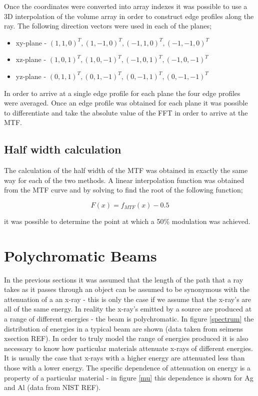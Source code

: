 \documentclass[
  twoside,
  11pt, a4paper,
  footinclude=true,
  headinclude=true,
  cleardoublepage=empty
]{scrbook}
\begin{document}
Once the coordinates were converted into array indexes it was possible to use a 3D interpolation of the volume array in order to construct edge profiles along the ray. The following direction vectors were used in each of the planes;

\begin{itemize}
\item xy-plane - ${(1,1,0)^T,(1,-1,0)^T,(-1,1,0)^T,(-1,-1,0)^T}$
\item xz-plane - ${(1,0,1)^T,(1,0,-1)^T,(-1,0,1)^T,(-1,0,-1)^T}$
\item yz-plane - ${(0,1,1)^T,(0,1,-1)^T,(0,-1,1)^T,(0,-1,-1)^T}$
\end{itemize}

In order to arrive at a single edge profile for each plane the four edge profiles were averaged. Once an edge profile was obtained for each plane it was possible to differentiate and take the absolute value of the FFT in order to arrive at the MTF.

\subsection{Half width calculation}

The calculation of the half width of the MTF was obtained in exactly the same way for each of the two methods. A linear interpolation function was obtained from the MTF curve and by solving to find the root of the following function;

\[
F(x) = f_{MTF}(x) - 0.5
\]

it was possible to determine the point at which a 50\% modulation was achieved.

\section{Polychromatic Beams}

In the previous sections it was assumed that the length of the path that a ray takes as it passes through an object can be assumed to be synonymous with the attenuation of a an x-ray - this is only the case if we assume that the x-ray's are all of the same energy. In reality the x-ray's emitted by a source are produced at a range of different energies - the beam is polychromatic. In figure \ref{spectrum} the distribution of energies in a typical beam are shown (data taken from seimens xsection REF). In order to truly model the range of energies produced it is also necessary to know how particular materials attenuate x-rays of different energies. It is usually the case that x-rays with a higher energy are attenuated less than those with a lower energy. The specific dependence of attenuation on energy is a property of a particular material - in figure \ref{mu} this dependence is shown for Ag and Al (data from NIST REF).
\end{document}
